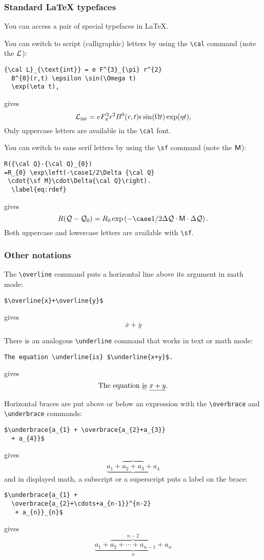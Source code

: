 \subsubsection[Standard \protect\LaTeX{} typefaces]{Standard LaTeX typefaces}

You can access a pair of special typefaces in \LaTeX.

You can switch to script (calligraphic) letters by using the \verb+\cal+
command (note the $\cal L$):
\begin{verbatim}
{\cal L}_{\text{int}} = e F^{3}_{\pi} r^{2}
  B^{0}(r,t) \epsilon \sin(\Omega t)
  \exp(\eta t),
\end{verbatim}
gives
\[
{\cal L}_{\text{int}} = eF^{3}_{\pi} r^{2}
 B^{0}(r,t)\epsilon\sin(\Omega t)\exp(\eta t),
\]
Only uppercase letters are available in the \verb+\cal+ font.


You can switch to sans serif letters by using the \verb+\sf+
command (note the $\sf M$):
\begin{verbatim}
R({\cal Q}-{\cal Q}_{0})
=R_{0} \exp\left(-\case1/2\Delta {\cal Q}
 \cdot{\sf M}\cdot\Delta{\cal Q}\right).
  \label{eq:rdef}
\end{verbatim}
gives
\[
  R({\cal Q}-{\cal Q}_{0}) =
  R_{0} \exp\left(-\case1/2\Delta {\cal Q} \cdot {\sf M}
  \cdot \Delta {\cal Q}\right).
\]
Both uppercase and lowercase letters are available with \verb+\sf+.


\subsubsection{Other notations}

The \verb+\overline+ command puts a horizontal line above its argument
in math mode:
\begin{verbatim}
$\overline{x}+\overline{y}$
\end{verbatim}
gives
\[
\overline{x}+\overline{y}
\]

There is an analogous \verb+\underline+ command that works in text
or math mode:
\begin{verbatim}
The equation \underline{is} $\underline{x+y}$.
\end{verbatim}
gives
\[
\hbox{The equation \underline{is} $\underline{x+y}$.}
\]

Horizontal braces are put above or below an expression with the
\verb+\overbrace+ and \verb+\underbrace+ commands:
\begin{verbatim}
$\underbrace{a_{1} + \overbrace{a_{2}+a_{3}}
  + a_{4}}$
\end{verbatim}
gives
\[
\underbrace{a_{1} + \overbrace{a_{2}+a_{3}} + a_{4}}
\]
and in displayed math, a subscript or a superscript puts a label on
the brace:
\begin{verbatim}
$\underbrace{a_{1} +
  \overbrace{a_{2}+\cdots+a_{n-1}}^{n-2}
   + a_{n}}_{n}$
\end{verbatim}
gives
\[
\underbrace{a_{1} + \overbrace{a_{2}+\cdots+a_{n-1}}^{n-2} + a_{n}}_{n}
\]

